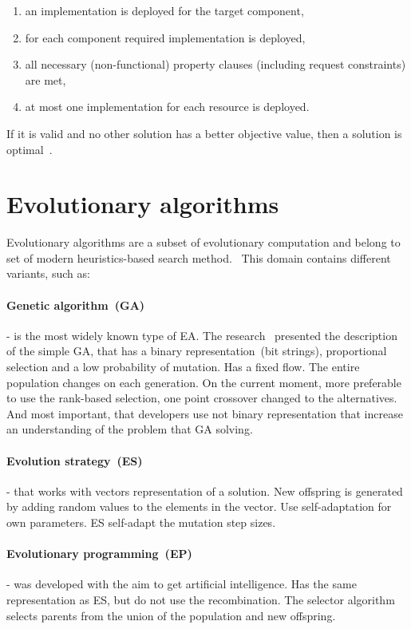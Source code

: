 \begin{enumerate}
	\item an implementation is deployed for the target component,
	\item for each component required implementation is deployed,
	\item all necessary (non-functional) property clauses (including request constraints) are met,
	\item at most one implementation for each resource is deployed.
\end{enumerate}

If it is valid and no other solution has a better objective value, then a solution is optimal~\cite{gotz18}.

\section{Evolutionary algorithms}
\label{sec:GeneticAlgorithm}

Evolutionary algorithms are a subset of evolutionary computation and belong to set of modern heuristics-based search method.~\cite{vikhar16}
This domain contains different variants, such as:
	\paragraph{Genetic algorithm~(GA)} - is the most widely known type of EA\cite{eiben03}. The research~\cite{deJong75} presented the description of the simple GA, that has a binary representation~(bit strings), proportional selection and a low probability of mutation. Has a fixed flow. The entire population changes on each generation. On the current moment, more preferable to use the rank-based selection, one point crossover changed to the alternatives. And most important, that developers use not binary representation that increase an understanding of the problem that GA solving.
	\paragraph{Evolution strategy~(ES)} - that works with vectors representation of a solution. New offspring is generated by adding random values to the elements in the vector. Use self-adaptation for own parameters. ES self-adapt  the mutation step sizes.
	\paragraph{Evolutionary programming~(EP)} - was developed with the aim to get artificial intelligence\cite{eiben03}. Has the same representation as ES, but do not use the recombination. The selector algorithm selects parents from the union of the population and new offspring.
